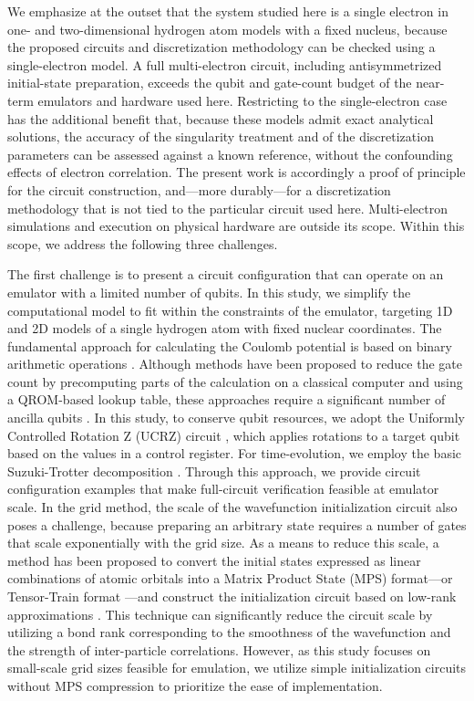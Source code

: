 \documentclass[manuscript_main.tex]{subfiles}
\begin{document}
We emphasize at the outset that the system studied here is a single
electron in one- and two-dimensional hydrogen atom models with a fixed
nucleus, because the proposed circuits and discretization methodology can be
checked using a single-electron model. A full multi-electron circuit,
including antisymmetrized initial-state preparation, exceeds the qubit and
gate-count budget of the near-term emulators and hardware used here.
Restricting to the single-electron case has the additional benefit
that, because these models admit exact analytical solutions, the accuracy
of the singularity treatment and of the discretization parameters can be
assessed against a known reference, without the confounding effects of
electron correlation. The present work is accordingly a proof of
principle for the circuit construction, and---more durably---for a
discretization methodology that is not tied to the particular circuit
used here. Multi-electron simulations and execution on physical hardware
are outside its scope. Within this scope, we address the following three
challenges.

The first challenge is to present a circuit configuration that can operate on an
emulator with a limited number of qubits. In this study, we simplify the
computational model to fit within the constraints of the emulator, targeting 1D and
2D models of a single hydrogen atom with fixed nuclear coordinates. The
fundamental approach for calculating the Coulomb potential is based on binary
arithmetic operations \cite{Zalka-rspa.1998.0162}. Although methods have been
proposed to reduce the gate count by precomputing parts of the calculation on a
classical computer and using a QROM-based lookup table, these approaches require
a significant number of ancilla qubits \cite{Sanders2020.PRXQuantum.1.020312}.
In this study, to conserve qubit resources, we adopt the Uniformly Controlled
Rotation Z (UCRZ) circuit \cite{Mottonen2004.PhysRevLett.93.130502}, which
applies rotations to a target qubit based on the values in a control register.
For time-evolution, we employ the basic Suzuki-Trotter
decomposition \cite{Zalka-rspa.1998.0162}. Through this approach, we provide circuit configuration examples that make
full-circuit verification feasible at emulator scale. In the grid method, the scale of the wavefunction initialization
circuit also poses a challenge, because preparing an arbitrary state requires a
number of gates that scale exponentially with the grid size. As a means to
reduce this scale, a method has been proposed to convert the initial states
expressed as linear combinations of atomic orbitals into a Matrix Product State
(MPS) format---or Tensor-Train format
\cite{Oseledets2011.doi:10.1137/090752286}---and construct the initialization
circuit based on low-rank approximations \cite{Huggins2025.PRXQuantum.6.020319}.
This technique can significantly reduce the circuit scale by utilizing a bond
rank corresponding to the smoothness of the wavefunction and the strength of
inter-particle correlations. However, as this study focuses on small-scale
grid sizes feasible for emulation, we utilize simple initialization circuits
without MPS compression to prioritize the ease of implementation. 
\end{document}
